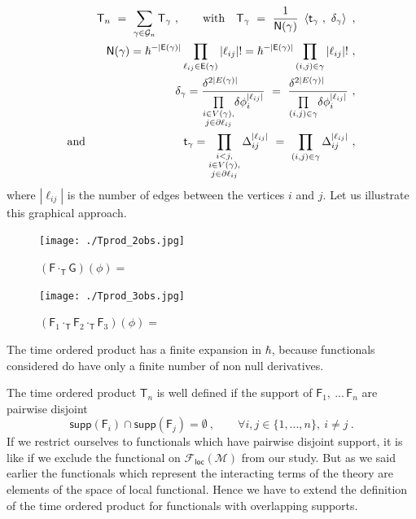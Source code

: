 \documentclass[12pt]{book}
\newcommand{\supp}{\mathsf{supp}}
\newcommand{\abs}[1]{\left|#1\right|}
\newcommand{\sm}[1]{\left\langle#1\right\rangle}
\newcommand{\Fcal}{\mathcal{F}}
\newcommand{\Gcal}{\mathcal{G}}
\newcommand{\Mcal}{\mathcal{M}}
\newcommand{\Esf}{\mathsf{E}}
\newcommand{\Fsf}{\mathsf{F}}
\newcommand{\Gsf}{\mathsf{G}}
\newcommand{\Nsf}{\mathsf{N}}
\newcommand{\Tsf}{\mathsf{T}}
\newcommand{\tsf}{\mathsf{t}}
\theoremstyle{break}
\begin{document}
%
\begin{eqnarray}
&& \Tsf_n \ = \ \sum_{\gamma \in \Gcal_n} \Tsf_\gamma \ , \qquad \mbox{with} \quad \Tsf_\gamma \ = \ \frac{1}{\Nsf(\gamma)} \ \sm{\tsf_\gamma \ , \ \delta_\gamma} \ ,
\label{eq:time_ordered_prod_graph} \\
%
&& \Nsf(\gamma) = \hbar^{-\abs{\Esf(\gamma)}} \prod_{\ell_{ij}\in\Esf(\gamma)} \abs{\ell_{ij}} ! = \hbar^{-\abs{\Esf(\gamma)}} \prod_{(i,j) \in \gamma} \abs{\ell_{ij}} ! \ , \nonumber \\
%
&& \delta_\gamma = \frac{\delta^{2\abs{E(\gamma)}}\hfill}{\underset{\substack{i \in V(\gamma), \\ j \in \partial \ell_{ij}}}{\prod} \delta \phi_i^{\abs{\ell_{ij}}}} \ = \ \frac{\delta^{2\abs{E(\gamma)}}\hfill}{\underset{(i,j)\in\gamma}{\prod} \delta \phi_i^{\abs{\ell_{ij}}}} \ , \nonumber \\
%
\mbox{and} &&\tsf_\gamma = \prod_{\substack{i < j, \\ i \in V(\gamma), \\ j \in \partial \ell_{ij}}} \Delta_{ij}^{\abs{\ell_{ij}}} \ = \ \prod_{(i,j)\in\gamma} \Delta_{ij}^{\abs{\ell_{ij}}} \ , 
%
\label{eq:kernel}
\end{eqnarray}
%
where $\abs{\ell_{ij}}$ is the number of edges between the vertices $i$ and $j$. Let us illustrate this graphical approach. 


\begin{figure}[ht!]
\centering
\texttt{[image: ./Tprod\_2obs.jpg]}
\caption{$(\Fsf \cdot_{\Tsf} \Gsf)(\phi) = $}
\end{figure}


\begin{figure}[ht!]
\centering
\texttt{[image: ./Tprod\_3obs.jpg]}
\caption{$(\Fsf_1 \cdot_{\Tsf} \Fsf_2 \cdot_{\Tsf} \Fsf_3)(\phi) =$}
\end{figure}


The time ordered product has a finite expansion in $\hbar$, because functionals considered do have only a finite number of non null derivatives.


The time ordered product $\Tsf_n$ is well defined if the support of $\Fsf_1, \ ... \, \Fsf_n$ are pairwise disjoint
%
\begin{equation*}
\supp(\Fsf_i) \cap \supp(\Fsf_j) = \emptyset \ , \qquad \forall i , j \in \{1,...,n\}, \ i \neq j \ . 
\end{equation*}
%
If we restrict ourselves to functionals which have pairwise disjoint support, it is like if we exclude the functional on $\Fcal_\mathsf{loc}(\Mcal)$ from our study. But as we said earlier the functionals which represent the interacting terms of the theory are elements of the space of local functional. Hence we have to extend the definition of the time ordered product for functionals with overlapping supports.
\end{document}
